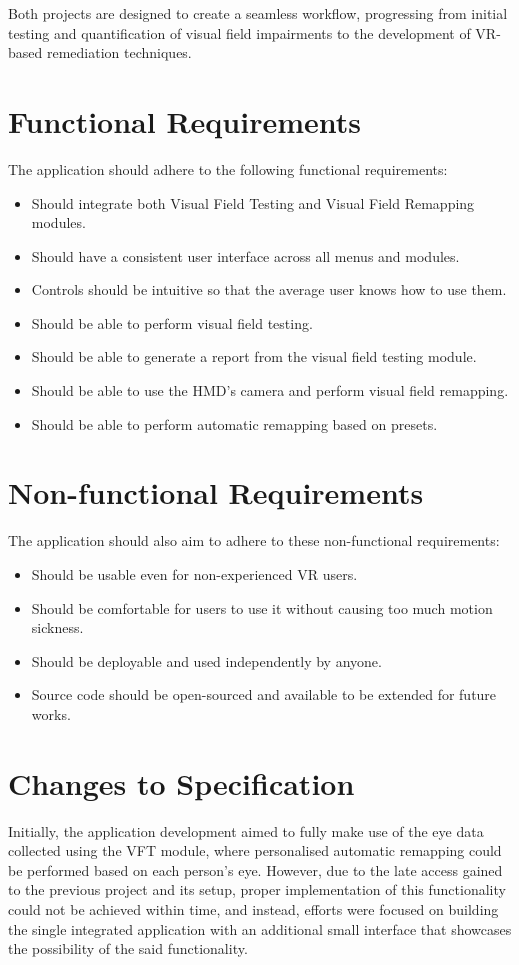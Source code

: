 \documentclass{l4proj}
\begin{document}
Both projects are designed to create a seamless workflow, progressing from initial testing and quantification of visual field impairments to the development of VR-based remediation techniques.

\section{Functional Requirements}
The application should adhere to the following functional requirements:
\begin{itemize}
    \item Should integrate both Visual Field Testing and Visual Field Remapping modules.
    \item Should have a consistent user interface across all menus and modules.
    \item Controls should be intuitive so that the average user knows how to use them.
    \item Should be able to perform visual field testing.
    \item Should be able to generate a report from the visual field testing module.
    \item Should be able to use the HMD's camera and perform visual field remapping.
    \item Should be able to perform automatic remapping based on presets.
\end{itemize}


\section{Non-functional Requirements}
The application should also aim to adhere to these non-functional requirements:
\begin{itemize}
    \item Should be usable even for non-experienced VR users.
    \item Should be comfortable for users to use it without causing too much motion sickness.
    \item Should be deployable and used independently by anyone.
    \item Source code should be open-sourced and available to be extended for future works.
\end{itemize}

\section{Changes to Specification}
Initially, the application development aimed to fully make use of the eye data collected using the VFT module, where personalised automatic remapping could be performed based on each person's eye. However, due to the late access gained to the previous project and its setup, proper implementation of this functionality could not be achieved within time, and instead, efforts were focused on building the single integrated application with an additional small interface that showcases the possibility of the said functionality.
\end{document}
